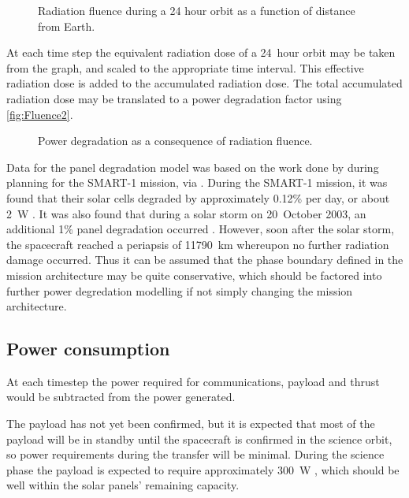 \begin{figure}
\caption{Radiation fluence during a 24 hour orbit as a function of distance from Earth.}
\label{fig:Fluence}
\centering
\def\svgwidth{\figurewidth}

\end{figure}
  
At each time step the equivalent radiation dose of a 24~hour orbit may be taken from the graph, and scaled to the appropriate time interval. This effective radiation dose is added to the accumulated radiation dose. The total accumulated radiation dose may be translated to a power degradation factor using \autoref{fig:Fluence2}.

\begin{figure}
\caption{Power degradation as a consequence of radiation fluence.}
\label{fig:Fluence2}
\centering
\def\svgwidth{\figurewidth}

\end{figure}

Data for the panel degradation model was based on the work done by \textcite{Hechler2002} during planning for the SMART-1 mission, via \textcite{Erb_thesis}. During the SMART-1 mission, it was found that their solar cells degraded by approximately 0.12\% per day, or about 2~W \parencite{Racca5}. It was also found that during a solar storm on 20~October 2003, an additional 1\% panel degradation occurred \parencite{Racca8}. However, soon after the solar storm, the spacecraft reached a periapsis of 11790~km whereupon no further radiation damage occurred. Thus it can be assumed that the phase boundary defined in the mission architecture may be quite conservative, which should be factored into further power degredation modelling if not simply changing the mission architecture.


\subsection{Power consumption} \label{sub:Power-consumption}

At each timestep the power required for communications, payload and thrust would be subtracted from the power generated. 

The payload has not yet been confirmed, but it is expected that most of the payload will be in standby until the spacecraft is confirmed in the science orbit, so power requirements during the transfer will be minimal. During the science phase the payload is expected to require approximately 300~W \parencite{web_BW-1}, which should be well within the solar panels' remaining capacity.


